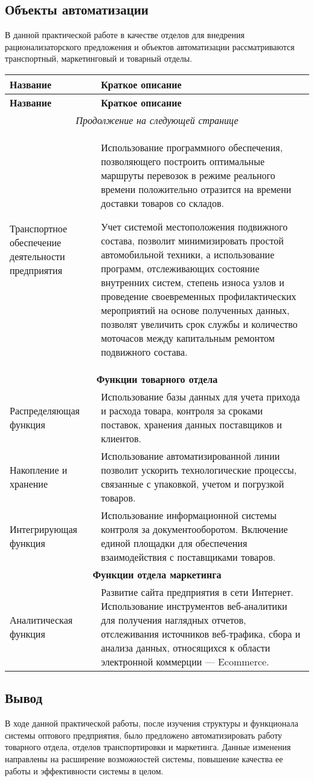 \documentclass[a4paper,14pt]{extarticle}
\begin{document}
\subsection{Объекты автоматизации}
В данной практической работе в качестве отделов для внедрения рационализаторского предложения и объектов автоматизации рассматриваются транспортный, маркетинговый и товарный отделы.
\small
\begin{longtable}[h!]{|p{0.3\linewidth}|p{0.7\linewidth}|}
	\hline
	\textbf{Название} & \textbf{Краткое описание} \\
	\hline \endfirsthead
	\hline
	\textbf{Название} & \textbf{Краткое описание} \\
	\hline \endhead
	\hline
	\multicolumn{2}{c}{\textit{Продолжение на следующей странице}}
	\endfoot
	\hline \endlastfoot
	\hline
	\multicolumn{2}{|c|}{\textbf{Функции транспортного отдела}} \\ \hline
	Транспортное обеспечение деятельности предприятия & Использование программного обеспечения, позволяющего построить оптимальные маршруты перевозок в режиме реального времени положительно отразится на времени доставки товаров со складов. 
	
	
	Учет системой местоположения подвижного состава, позволит минимизировать простой автомобильной техники, а использование программ, отслеживающих состояние внутренних систем, степень износа узлов и проведение своевременных профилактических мероприятий на основе полученных данных, позволят увеличить срок службы и количество моточасов между капитальным ремонтом подвижного состава.\\ \hline
	\multicolumn{2}{|c|}{\textbf{Функции товарного отдела}} \\ \hline
	Распределяющая функция & Использование базы данных для учета прихода и расхода товара, контроля за сроками поставок, хранения данных поставщиков и клиентов.  \\ \hline
	Накопление и хранение & Использование автоматизированной линии позволит ускорить технологические процессы, связанные с упаковкой, учетом и погрузкой товаров. \\ \hline
	Интегрирующая функция & Использование информационной системы контроля за документооборотом. Включение единой площадки для обеспечения взаимодействия с поставщиками товаров.\\ \hline
	\multicolumn{2}{|c|}{\textbf{Функции отдела маркетинга}} \\ \hline
	Аналитическая функция & Развитие сайта предприятия в сети Интернет. Использование инструментов веб-аналитики для получения наглядных отчетов, отслеживания источников веб-трафика, сбора и анализа данных, относящихся к области электронной коммерции --- Ecommerce.
\end{longtable}
\normalsize
\subsection{Вывод}
В ходе данной практической работы, после изучения структуры и функционала системы оптового предприятия, было предложено автоматизировать работу товарного отдела, отделов транспортировки и маркетинга. Данные изменения направлены на расширение возможностей системы, повышение качества ее работы и эффективности системы в целом.
	
\end{document}
